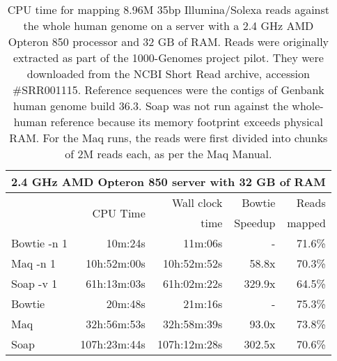 \documentclass[letterpaper]{article}
\begin{document}
\begin{table}[tp]
\scriptsize
\begin{tabular}{lrrrr}\multicolumn{5}{c}{2.4 GHz AMD Opteron 850 server with 32 GB of RAM}\\
\toprule
 & \multirow{2}{*}{CPU Time} & Wall clock & Bowtie  & Reads  \\
 &                            & time       & Speedup & mapped \\[3pt]
\toprule
Bowtie -n 1 & 10m:24s & 11m:06s & - & 71.6\%\\\midrule
Maq -n 1 & 10h:52m:00s & 10h:52m:52s & 58.8x & 70.3\%\\\midrule
Soap -v 1 & 61h:13m:03s & 61h:02m:22s & 329.9x & 64.5\%\\\midrule
Bowtie & 20m:48s & 21m:16s & - & 75.3\%\\\midrule
Maq & 32h:56m:53s & 32h:58m:39s & 93.0x & 73.8\%\\\midrule
Soap & 107h:23m:44s & 107h:12m:28s & 302.5x & 70.6\%\\
\bottomrule
\end{tabular}
\caption{CPU time for mapping 8.96M 35bp Illumina/Solexa reads against the whole human genome on a server with a 2.4 GHz AMD Opteron 850 processor and 32 GB of RAM. Reads were originally extracted as part of the 1000-Genomes project pilot. They were downloaded from the NCBI Short Read archive, accession \#SRR001115. Reference sequences were the contigs of Genbank human genome build 36.3. Soap was not run against the whole-human reference because its memory footprint exceeds physical RAM. For the Maq runs, the reads were first divided into chunks of 2M reads each, as per the Maq Manual.}
\end{table}
\end{document}

